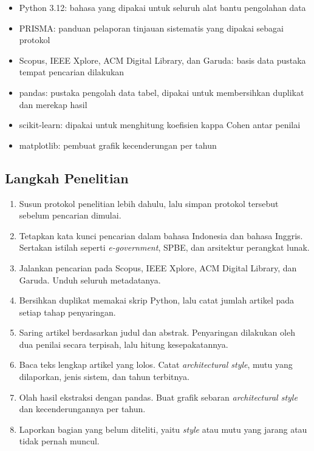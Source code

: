 \documentclass[11pt,a4paper]{article}
\begin{document}
\begin{itemize}[leftmargin=*]
  \item Python 3.12: bahasa yang dipakai untuk seluruh alat bantu pengolahan data
  \item PRISMA: panduan pelaporan tinjauan sistematis yang dipakai sebagai protokol
  \item Scopus, IEEE Xplore, ACM Digital Library, dan Garuda: basis data pustaka tempat pencarian dilakukan
  \item pandas: pustaka pengolah data tabel, dipakai untuk membersihkan duplikat dan merekap hasil
  \item scikit-learn: dipakai untuk menghitung koefisien kappa Cohen antar penilai
  \item matplotlib: pembuat grafik kecenderungan per tahun
\end{itemize}

\subsection{Langkah Penelitian}

\begin{enumerate}[leftmargin=*]
  \item Susun protokol penelitian lebih dahulu, lalu simpan protokol tersebut sebelum pencarian dimulai.
  \item Tetapkan kata kunci pencarian dalam bahasa Indonesia dan bahasa Inggris. Sertakan istilah seperti \textit{e-government}, SPBE, dan arsitektur perangkat lunak.
  \item Jalankan pencarian pada Scopus, IEEE Xplore, ACM Digital Library, dan Garuda. Unduh seluruh metadatanya.
  \item Bersihkan duplikat memakai skrip Python, lalu catat jumlah artikel pada setiap tahap penyaringan.
  \item Saring artikel berdasarkan judul dan abstrak. Penyaringan dilakukan oleh dua penilai secara terpisah, lalu hitung kesepakatannya.
  \item Baca teks lengkap artikel yang lolos. Catat \textit{architectural style}, mutu yang dilaporkan, jenis sistem, dan tahun terbitnya.
  \item Olah hasil ekstraksi dengan pandas. Buat grafik sebaran \textit{architectural style} dan kecenderungannya per tahun.
  \item Laporkan bagian yang belum diteliti, yaitu \textit{style} atau mutu yang jarang atau tidak pernah muncul.
\end{enumerate}
\end{document}
